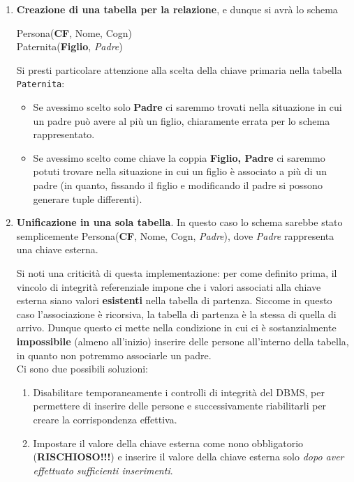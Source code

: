 \documentclass[12pt]{report}
\begin{document}
	\begin{enumerate}
		\item \textbf{Creazione di una tabella per la relazione}, e dunque si avrà lo schema
		\begin{center}
			Persona(\textbf{CF}, Nome, Cogn)\\
			Paternita(\textbf{Figlio}, \textit{Padre})
		\end{center}
		Si presti particolare attenzione alla scelta della chiave primaria nella tabella \texttt{Paternita}:
		\begin{itemize}
			\item Se avessimo scelto solo \textbf{Padre} ci saremmo trovati nella situazione in cui un padre può avere al più un figlio, chiaramente errata per lo schema rappresentato.
			
			\item Se avessimo scelto come chiave la coppia \textbf{Figlio, Padre} ci saremmo potuti trovare nella situazione in cui un figlio è associato a più di un padre (in quanto, fissando il figlio e modificando il padre si possono generare tuple differenti).
		\end{itemize}
		
		\item \textbf{Unificazione in una sola tabella}. In questo caso lo schema sarebbe stato semplicemente Persona(\textbf{CF}, Nome, Cogn, \textit{Padre}), dove \textit{Padre} rappresenta una chiave esterna.
		
		Si noti una criticità di questa implementazione: per come definito prima, il vincolo di integrità referenziale impone che i valori associati alla chiave esterna siano valori \textbf{esistenti} nella tabella di partenza. Siccome in questo caso l'associazione è ricorsiva, la tabella di partenza è la stessa di quella di arrivo. Dunque questo ci mette nella condizione in cui ci è sostanzialmente \textbf{impossibile} (almeno all'inizio) inserire delle persone all'interno della tabella, in quanto non potremmo associarle un padre.\\
		Ci sono due possibili soluzioni:
		\begin{enumerate}
			\item Disabilitare temporaneamente i controlli di integrità del DBMS, per permettere di inserire delle persone e successivamente riabilitarli per creare la corrispondenza effettiva.
			
			\item Impostare il valore della chiave esterna come nono obbligatorio (\textbf{RISCHIOSO!!!}) e inserire il valore della chiave esterna solo \textit{dopo aver effettuato sufficienti inserimenti}.
		\end{enumerate}
	\end{enumerate}
	
\end{document}
